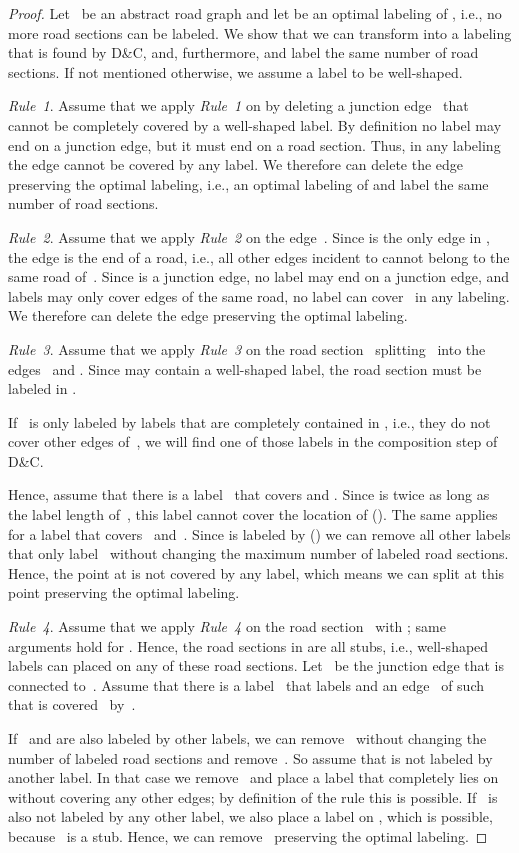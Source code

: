 \documentclass[a4paper,11pt]{article}
\newcommand{\RuleA}{\textit{Rule~1}\xspace}
\newcommand{\RuleB}{\textit{Rule~2}\xspace}
\newcommand{\RuleC}{\textit{Rule~3}\xspace}
\newcommand{\RuleD}{\textit{Rule~4}\xspace}
\newcommand{\Shredder}{\textsc{D\&C}}
\begin{document}
\begin{proof}
  Let~ be an abstract road graph and let  be an
  optimal labeling of , i.e., no more road sections can be labeled.
  We show that we can transform  into a labeling
   that is found by \Shredder, and, furthermore,  and  label the same number of road sections. If not
  mentioned otherwise, we assume a label to be well-shaped.
 
  \RuleA. Assume that we apply \RuleA on  by deleting a junction
  edge~ that cannot be completely covered by a well-shaped
  label. By definition no label may end on a junction edge, but it
  must end on a road section. Thus, in any labeling the edge 
  cannot be covered by any label. We therefore can delete the edge
  preserving the optimal labeling, i.e., an optimal labeling of 
  and  label the same number of road sections.

  \RuleB. Assume that we apply \RuleB on the edge~. Since  is
  the only edge in , the edge is the end of a road, i.e., all
  other edges incident to  cannot belong to the same road of~. Since  is a junction edge, no label may end on a junction
  edge, and labels may only cover edges of the same road, no label can
  cover~ in any labeling. We therefore can delete the edge preserving the optimal labeling.

  \RuleC. Assume that we apply \RuleC on the road section~
  splitting~ into the edges~ and .
  Since   may
  contain a well-shaped label, the road section  must be labeled in
  .

  If~ is only labeled by labels that are completely
  contained in , i.e., they do not cover other edges of~, we
  will find one of those labels in the composition step of \Shredder.

  Hence, assume that there is a label~ that
  covers  and . Since  is twice as long as the label length
  of~, this label cannot cover the location of (). The
  same applies for a label  that covers~
  and~. Since  is labeled by  () we can remove
  all other labels that only label~ without changing the maximum
  number of labeled road sections. Hence, the point at  is not
  covered by any label, which means we can split  at this
  point preserving the optimal labeling.

  \RuleD. Assume that we apply \RuleD on the road section~
  with ; same arguments hold for . Hence, the road sections
  in  are all stubs, i.e., well-shaped labels can placed
  on any of these road sections. Let~ be the junction edge that is
  connected to~. Assume that there is a label~ that labels
   and an edge~ of  such that  is covered~ by~.

  If~ and  are also labeled by other labels, we can
  remove~ without changing the number of labeled road sections
  and remove~.  So assume that  is not labeled by another
  label. In that case we remove~ and place a label that
  completely lies on  without covering any other edges; by
  definition of the rule this is possible. If~ is also not labeled
  by any other label, we also place a label on , which is
  possible, because~ is a stub. Hence, we can remove~ preserving the optimal labeling. 
\end{proof}
\end{document}
